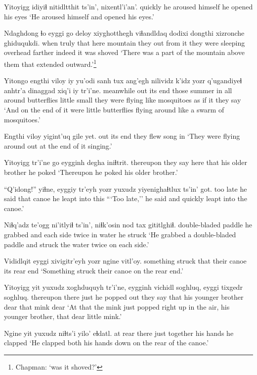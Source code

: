 \documentclass[12pt]{article}
\begin{document}
\gll Yitoyigg {idiyiɬ nitidltthit} ts'in', nixentl'i'an'.
quickly {he aroused himself} {} {he opened his eyes}
\glt `He aroused himself and opened his eyes.'
\glend

\gll Ndaghdong ɬo eyggi go deloy  xiyghotthegh viɬandldaq dodixi  dongthi xizronche {ghiduqukdi.}
when truly that here mountain {they out from it} {they were sleeping} overhead farther indeed {it was shoved}
\glt `There was a part of the mountain above them that extended outward.'\footnote{Chapman: `was it shoved?'}
\glend

\gll Yitongo engthi viloy {iy yu'odi} sanh tux  ang'egh nilividz k'idz yozr q'ugandiyeɬ anhtr'a dinaggad xiq'i iy tr'i'ne.
meanwhile out {its end} those summer in {all around} butterflies little small {they were flying} like mosquitoes {as if} it {they say}
\glt `And on the end of it were little butterflies flying around like a swarm of mosquitoes.'
\glend

\gll Engthi viloy  yigint'uq gile yet.
out  {its end} {they flew} song in
\glt `They were flying around out at the end of it singing.'
\glend

\gll Yitoyigg tr'i'ne go eygginh degha   iniɬtrit.
thereupon {they say} here that {his older brother} {he poked}
\glt `Thereupon he poked his older brother.'
\glend

\gll ``Q'idong!'' yiɬne, eyggiy {tr'eyh yozr} yuxudz yiyenighaɬtlux ts'in' got.
{too late} {he said} that canoe {} {he leapt into} {} this
\glt ```Too late,'' he said and quickly leapt into the canoe.'
\glend

\gll Niɬq'adz te'ogg ni'itlyiɬ ts'in', niɬk'osin nod tax gititlghiɬ.
double-bladed paddle {he grabbed} and {each side} twice {in water} {he struck}
\glt `He grabbed a double-bladed paddle and struck the water twice on each side.'
\glend

\gll Vididlqit  eyggi {xivigitr'eyh yozr} {ngine vitl'oy.}
{something struck} that {their canoe} {its rear end}
\glt `Something struck their canoe on the rear end.'
\glend

\gll Yitoyigg yit yuxudz xoghduquyh tr'i'ne, eygginh  vichidl  soghluq, eyggi tixgedr soghluq.
thereupon there just {he popped out} {they say} that  {his younger brother} dear  that mink  dear
\glt `At that the mink just popped right up in the air, his younger brother, that dear little mink.'
\glend

\gll Ngine yit yuxudz niɬts'i   yilo' eɬdatl.
{at rear} there just together {his hands} {he clapped}
\glt `He clapped both his hands down on the rear of the canoe.'
\glend
\end{document}
